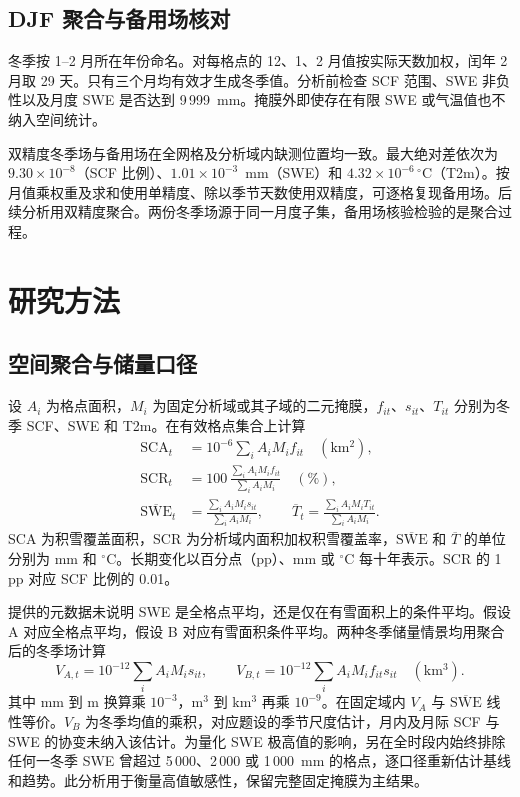 \subsection{DJF 聚合与备用场核对}

冬季按 1--2 月所在年份命名。对每格点的 12、1、2 月值按实际天数加权，闰年 2 月取 29 天。只有三个月均有效才生成冬季值。分析前检查 SCF 范围、SWE 非负性以及月度 SWE 是否达到 9\,999~mm。掩膜外即使存在有限 SWE 或气温值也不纳入空间统计。

双精度冬季场与备用场在全网格及分析域内缺测位置均一致。最大绝对差依次为 $9.30\times10^{-8}$（SCF 比例）、$1.01\times10^{-3}$~mm（SWE）和 $4.32\times10^{-6}\,^\circ$C（T2m）。按月值乘权重及求和使用单精度、除以季节天数使用双精度，可逐格复现备用场。后续分析用双精度聚合。两份冬季场源于同一月度子集，备用场核验检验的是聚合过程。

\section{研究方法}

\subsection{空间聚合与储量口径}

设 $A_i$ 为格点面积，$M_i$ 为固定分析域或其子域的二元掩膜，$f_{it}$、$s_{it}$、$T_{it}$ 分别为冬季 SCF、SWE 和 T2m。在有效格点集合上计算
\begin{align}
  \mathrm{SCA}_t &= 10^{-6}\sum_i A_i M_i f_{it}\quad(\mathrm{km^2}),\\
  \mathrm{SCR}_t &= 100\,\frac{\sum_i A_i M_i f_{it}}{\sum_i A_i M_i}\quad(\%),\\
  \overline{\mathrm{SWE}}_t &= \frac{\sum_i A_i M_i s_{it}}{\sum_i A_i M_i}, \qquad
  \overline{T}_t = \frac{\sum_i A_i M_i T_{it}}{\sum_i A_i M_i}.
\end{align}
SCA 为积雪覆盖面积，SCR 为分析域内面积加权积雪覆盖率，$\overline{\mathrm{SWE}}$ 和 $\overline T$ 的单位分别为 mm 和 $^\circ$C。长期变化以百分点（pp）、mm 或 $^\circ$C 每十年表示。SCR 的 1 pp 对应 SCF 比例的 0.01。

提供的元数据未说明 SWE 是全格点平均，还是仅在有雪面积上的条件平均。假设 A 对应全格点平均，假设 B 对应有雪面积条件平均。两种冬季储量情景均用聚合后的冬季场计算
\begin{equation}
 V_{A,t} = 10^{-12}\sum_i A_iM_i s_{it}, \qquad
 V_{B,t} = 10^{-12}\sum_i A_iM_i f_{it}s_{it}\quad(\mathrm{km^3}).
\end{equation}
其中 mm 到 m 换算乘 $10^{-3}$，$\mathrm{m^3}$ 到 $\mathrm{km^3}$ 再乘 $10^{-9}$。在固定域内 $V_A$ 与 $\overline{\mathrm{SWE}}$ 线性等价。$V_B$ 为冬季均值的乘积，对应题设的季节尺度估计，月内及月际 SCF 与 SWE 的协变未纳入该估计。为量化 SWE 极高值的影响，另在全时段内始终排除任何一冬季 SWE 曾超过 5\,000、2\,000 或 1\,000~mm 的格点，逐口径重新估计基线和趋势。此分析用于衡量高值敏感性，保留完整固定掩膜为主结果。


